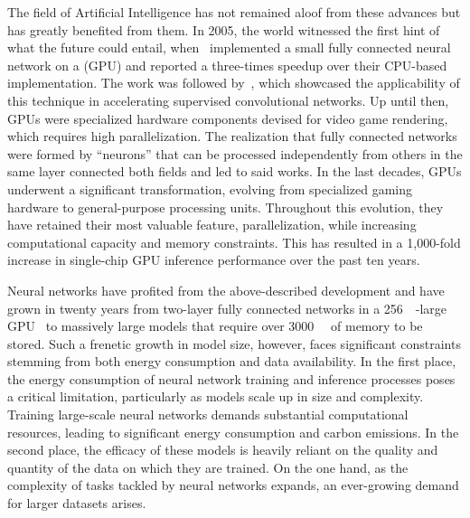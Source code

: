 The field of Artificial Intelligence has not remained aloof from these advances but has greatly benefited from them. In 2005, the world witnessed the first hint of what the future could entail, when~ implemented a small fully connected neural network on a  (GPU) and reported a three-times speedup over their CPU-based implementation. The work was followed by~, which showcased the applicability of this technique in accelerating supervised convolutional networks. Up until then, GPUs were specialized hardware components devised for video game rendering, which requires high parallelization. The realization that fully connected networks were formed by ``neurons'' that can be processed independently from others in the same layer connected both fields and led to said works. In the last decades, GPUs underwent a significant transformation, evolving from specialized gaming hardware to general-purpose processing units. Throughout this evolution, they have retained their most valuable feature, parallelization, while increasing computational capacity and memory constraints. This has resulted in a 1,000-fold increase in single-chip GPU inference performance over the past ten years.


Neural networks have profited from the above-described development and have grown in twenty years from two-layer fully connected networks in a \qty{256}{\mega\byte}-large GPU~ to massively large models that require over \qty{3000}{\giga\byte} of memory to be stored. Such a frenetic growth in model size, however, faces significant constraints stemming from both energy consumption and data availability. In the first place, the energy consumption of neural network training and inference processes poses a critical limitation, particularly as models scale up in size and complexity. Training large-scale neural networks demands substantial computational resources, leading to significant energy consumption and carbon emissions. In the second place, the efficacy of these models is heavily reliant on the quality and quantity of the data on which they are trained. On the one hand, as the complexity of tasks tackled by neural networks expands, an ever-growing demand for larger datasets arises.

